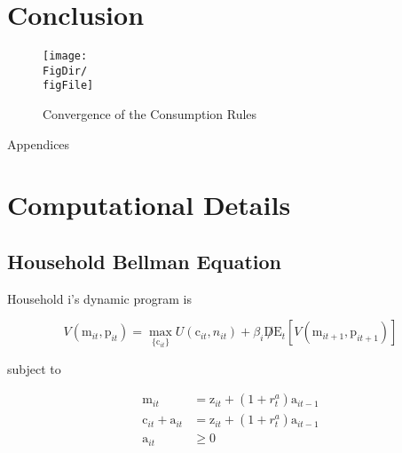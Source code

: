 \documentclass[titlepage]{\econtex}\providecommand{\texname}{BufferStockTheory}
\providecommand{\FigDir}{Figures}
\begin{document}
\section{Conclusion}







\providecommand{\figName}{Convergence-of-the-Consumption-Rules}
\providecommand{\figFile}{cFuncsConverge}
\hypertarget{\figFile}{}
\hypertarget{\figName}{}
\begin{figure}[tbp]
\centerline{\texttt{[image: \\FigDir/\\figFile]}}
\caption{Convergence of the Consumption Rules}
\label{fig:\figFile}
\end{figure}














\clearpage\vfill\eject

\appendix

\centerline{\LARGE Appendices}\vspace{0.2in}




\clearpage\vfill\eject

\normalsize


\hypertarget{Computational Details}{}
\section{Computational Details}

\hypertarget{Household Bellman Equation }{}
\subsection{Household Bellman Equation}

Household i's dynamic program is

$$ V(\pmb{\mathrm{m}}_{it},\pmb{\mathrm{p}}_{it})=\max_{\{ \pmb{\mathrm{c}}_{it}\}} { U( \pmb{\mathrm{c}}_{it}, n_{it}) + \beta_{i} \not D \mathrm{E}_{t}[V( \pmb{\mathrm{m}}_{it+1} , \pmb{\mathrm{p}}_{it+1})]}$$

subject to 

\begin{align*}
 \pmb{\mathrm{m}}_{i t} & = \pmb{\mathrm{z}}_{i t}  + (1+\mathit{r}^{a}_{t})\pmb{\mathrm{a}}_{i t-1} \\
 \pmb{\mathrm{c}}_{i t}  + \pmb{\mathrm{a}}_{i t} &= \pmb{\mathrm{z}}_{i t}  + (1+\mathit{r}^{a}_{t}) \pmb{\mathrm{a}}_{i t-1}   \\
\pmb{\mathrm{a}}_{it} &\geq 0 
\end{align*} \\ \\
\end{document}
